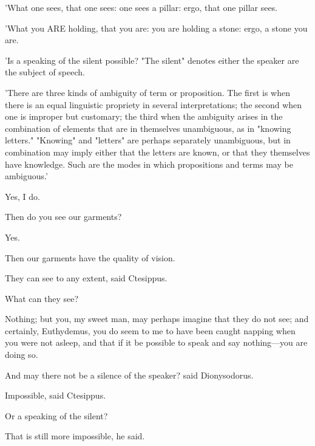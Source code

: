 \documentclass[11pt,letter]{article}
\begin{document}
\par  'What one sees, that one sees: one sees a pillar: ergo, that one pillar sees.

\par  'What you ARE holding, that you are: you are holding a stone: ergo, a stone you are.

\par  'Is a speaking of the silent possible? "The silent" denotes either the speaker are the subject of speech.

\par  'There are three kinds of ambiguity of term or proposition. The first is when there is an equal linguistic propriety in several interpretations; the second when one is improper but customary; the third when the ambiguity arises in the combination of elements that are in themselves unambiguous, as in "knowing letters." "Knowing" and "letters" are perhaps separately unambiguous, but in combination may imply either that the letters are known, or that they themselves have knowledge. Such are the modes in which propositions and terms may be ambiguous.'

\par  Yes, I do.

\par  Then do you see our garments?

\par  Yes.

\par  Then our garments have the quality of vision.

\par  They can see to any extent, said Ctesippus.

\par  What can they see?

\par  Nothing; but you, my sweet man, may perhaps imagine that they do not see; and certainly, Euthydemus, you do seem to me to have been caught napping when you were not asleep, and that if it be possible to speak and say nothing—you are doing so.

\par  And may there not be a silence of the speaker? said Dionysodorus.

\par  Impossible, said Ctesippus.

\par  Or a speaking of the silent?

\par  That is still more impossible, he said.
\end{document}
